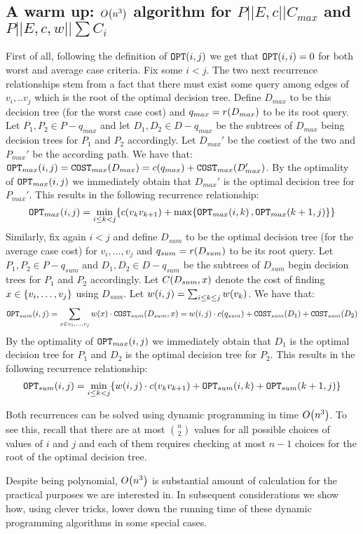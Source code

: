 \subsection{A warm up: $O\mathopen{}\left( n^3 \right)$ algorithm for $P||E,c|| C_{max} $ and $P||E,c, w|| \sum C_i$}

First of all, following the definition of $\texttt{OPT}\mathopen{}\left( i,j \right)$ we get that $\texttt{OPT}\mathopen{}\left( i,i \right)=0$ for both worst and average case criteria.
Fix some $i<j$. The two next recurrence relationships stem from a fact that  there must exist some query among edges of $v_i,..v_j$ which is the root of the optimal decision tree. Define $D_{max}$ to be this decision tree (for the worst case cost) and $q_{max}=r\mathopen{}\left( D_{max} \right)$ to be its root query. Let $P_1,P_2\in P-q_{max}$ and let $D_1, D_2\in D-q_{max}$ be the subtrees of $D_{max}$ being decision trees for $P_1$ and $P_2$ accordingly. Let $D_{max}'$ be the costiest of the two and $P_{max}'$ be the according path. We have that: $\texttt{OPT}_{max}\mathopen{}\left( i,j \right)=\texttt{COST}_{max}\mathopen{}\left( D_{max} \right)=c\mathopen{}\left( q_{max} \right)+\texttt{COST}_{max}\mathopen{}\left( D_{max}' \right)$. 
By the optimality of $\texttt{OPT}_{max}\mathopen{}\left( i,j \right)$ we immediately obtain that $D_{max}'$ is the optimal decision tree for $P_{max}'$. This results in the following recurrence relationship:
$$
\texttt{OPT}_{max}\mathopen{}\left( i,j \right) = \min_{i\leq k<j}\mathopen{}\left\{ c\mathopen{}\left( v_kv_{k+1} \right)+\max\mathopen{}\left\{ \texttt{OPT}_{max}\mathopen{}\left( i, k \right), \texttt{OPT}_{max}\mathopen{}\left( k+1, j \right) \right\} \right\}
$$
Similarly, fix again $i<j$ and define $D_{sum}$ to be the optimal decision tree (for the average case cost) for $v_i,\dots,v_j$ and $q_{sum}=r\mathopen{}\left( D_{sum} \right)$ to be its root query. Let $P_1,P_2\in P-q_{sum}$ and $D_1, D_2\in D-q_{sum}$ be the subtrees of $D_{sum}$ begin decision trees for $P_1$ and $P_2$ accordingly. Let $C\mathopen{}\left( D_{sum}, x \right)$ denote the cost of finding $x\in\mathopen{}\left\{ v_i,\dots,v_j \right\}$ using $D_{sum}$. Let $w\mathopen{}\left( i,j \right)=\sum_{i\leq k\leq j}w\mathopen{}\left( v_k \right)$. We have that:
$$
\texttt{OPT}_{sum}\mathopen{}\left( i,j \right)=\sum_{x\in v_i,\dots,v_j}w\mathopen{}\left( x \right)\cdot \texttt{COST}_{sum}\mathopen{}\left( D_{sum}, x \right)=w\mathopen{}\left( i,j \right)\cdot c\mathopen{}\left( q_{sum} \right) + \texttt{COST}_{sum}\mathopen{}\left( D_1 \right) + \texttt{COST}_{sum}\mathopen{}\left( D_2 \right)
$$
By the optimality of $\texttt{OPT}_{max}\mathopen{}\left( i,j \right)$ we immediately obtain that $D_1$ is the optimal decision tree for $P_1$ and $D_2$ is the optimal decision tree for $P_2$. This results in the following recurrence relationship:
$$
\texttt{OPT}_{sum}\mathopen{}\left( i,j \right) = \min_{i\leq k<j}\mathopen{}\left\{ w\mathopen{}\left( i,j \right)\cdot c\mathopen{}\left( v_kv_{k+1} \right)+\texttt{OPT}_{sum}\mathopen{}\left( i, k \right)+ \texttt{OPT}_{sum}\mathopen{}\left( k+1, j \right) \right\}
$$

Both recurrences can be solved using dynamic programming in time $O\mathopen{}\left( n^3 \right)$. To see this, recall that there are at most $\binom{n}{2}$ values for all possible choices of values of $i$ and $j$ and each of them requires checking at most $n-1$ choices for the root of the optimal decision tree.

Despite being polynomial, $O\mathopen{}\left( n^3 \right)$ is substantial amount of calculation for the practical purposes we are interested in. In subsequent considerations we show how, using clever tricks, lower down the running time of these dynamic programming algorithms in some special cases. 

